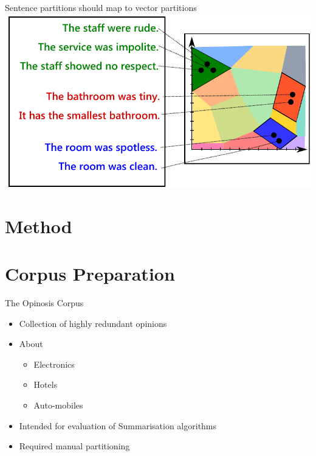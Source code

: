 \documentclass[12pt,landscape,english]{beamer}
\begin{document}
\begingroup %
\begin{frame}{Sentence partitions should map to vector partitions}
	\includegraphics[scale=0.6]{equiv}
\end{frame}
\endgroup


\section{Method}
\section{Corpus Preparation}

\begin{frame}{The Opinosis Corpus}
	\begin{itemize}
		\item Collection of highly redundant opinions
		\item About \begin{itemize}
			\item Electronics
			\item Hotels
			\item Auto-mobiles
		\end{itemize}
		
		\item Intended for evaluation of Summarisation algorithms
		\item Required manual partitioning
	\end{itemize}
\end{frame}
\end{document}
